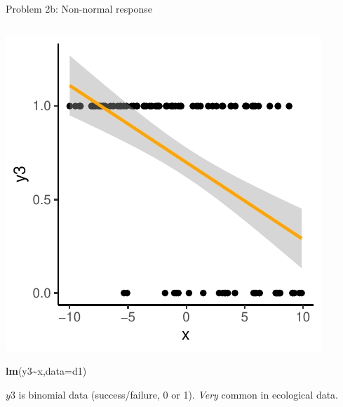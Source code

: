 \documentclass[
  ignorenonframetext,
  aspectratio=169]{beamer}
\newenvironment{Shaded}{\begin{snugshade}}{\end{snugshade}}
\newcommand{\AttributeTok}[1]{\textcolor[rgb]{0.13,0.29,0.53}{#1}}
\newcommand{\FunctionTok}[1]{\textcolor[rgb]{0.13,0.29,0.53}{\textbf{#1}}}
\newcommand{\NormalTok}[1]{#1}
\newcommand{\SpecialCharTok}[1]{\textcolor[rgb]{0.81,0.36,0.00}{\textbf{#1}}}
\let\oldShaded\Shaded %
\let\endoldShaded\endShaded
\renewenvironment{Shaded}{\scriptsize\oldShaded}{\endoldShaded}
\begin{document}
\begin{frame}[fragile]{Problem 2b: Non-normal response}
\protect\hypertarget{problem-2b-non-normal-response}{}
\begin{columns}[T]
\begin{column}{0.48\textwidth}
\includegraphics{03-Lecture_files/figure-beamer/unnamed-chunk-39-1.pdf}

\begin{Shaded}
\begin{Highlighting}[]
\FunctionTok{lm}\NormalTok{(y3}\SpecialCharTok{\textasciitilde{}}\NormalTok{x,}\AttributeTok{data=}\NormalTok{d1)}
\end{Highlighting}
\end{Shaded}

\(y3\) is binomial data (success/failure, 0 or 1). \emph{Very} common in
ecological data.
\end{column}


\end{columns}
\end{frame}
\end{document}
